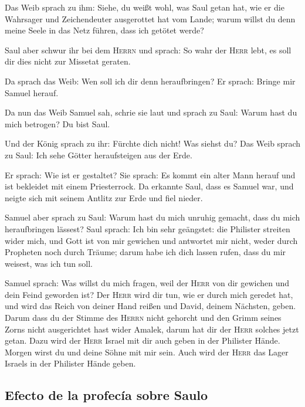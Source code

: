  Das Weib sprach zu ihm: Siehe, du weißt wohl, was Saul
getan hat, wie er die Wahrsager und Zeichendeuter ausgerottet hat vom
Lande; warum willst du denn meine Seele in das Netz führen, dass ich
getötet werde?

 Saul aber schwur ihr bei dem \textsc{Herrn} und sprach:
So wahr der \textsc{Herr} lebt, es soll dir dies nicht zur Missetat
geraten.

 Da sprach das Weib: Wen soll ich dir denn heraufbringen?
Er sprach: Bringe mir Samuel herauf.

 Da nun das Weib Samuel sah, schrie sie laut und sprach
zu Saul: Warum hast du mich betrogen? Du bist Saul.

 Und der König sprach zu ihr: Fürchte dich nicht! Was
siehst du? Das Weib sprach zu Saul: Ich sehe Götter heraufsteigen aus
der Erde.

 Er sprach: Wie ist er gestaltet? Sie sprach: Es kommt
ein alter Mann herauf und ist bekleidet mit einem Priesterrock. Da
erkannte Saul, dass es Samuel war, und neigte sich mit seinem Antlitz
zur Erde und fiel nieder.

 Samuel aber sprach zu Saul: Warum hast du mich unruhig
gemacht, dass du mich heraufbringen lässest? Saul sprach: Ich bin sehr
geängstet: die Philister streiten wider mich, und Gott ist von mir
gewichen und antwortet mir nicht, weder durch Propheten noch durch
Träume; darum habe ich dich lassen rufen, dass du mir weisest, was ich
tun soll.

 Samuel sprach: Was willst du mich fragen, weil der
\textsc{Herr} von dir gewichen und dein Feind geworden ist?
 Der \textsc{Herr} wird dir tun, wie er durch mich
geredet hat, und wird das Reich von deiner Hand reißen und David, deinem
Nächsten, geben.  Darum dass du der Stimme des
\textsc{Herrn} nicht gehorcht und den Grimm seines Zorns nicht
ausgerichtet hast wider Amalek, darum hat dir der \textsc{Herr} solches
jetzt getan.  Dazu wird der \textsc{Herr} Israel mit dir
auch geben in der Philister Hände. Morgen wirst du und deine Söhne mit
mir sein. Auch wird der \textsc{Herr} das Lager Israels in der Philister
Hände geben.

\hypertarget{efecto-de-la-profecuxeda-sobre-saulo}{%
\subsection{Efecto de la profecía sobre
Saulo}\label{efecto-de-la-profecuxeda-sobre-saulo}}

